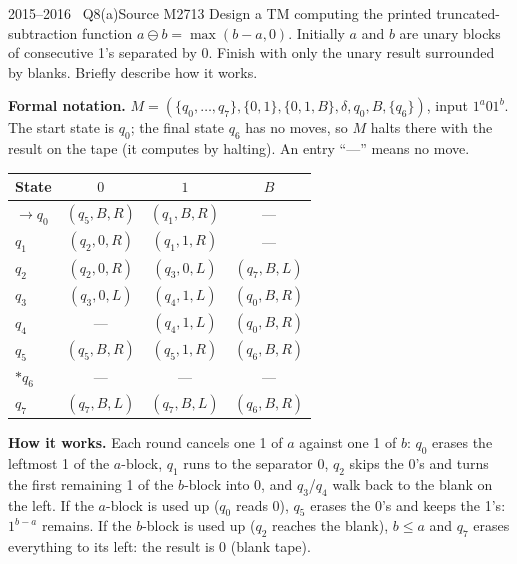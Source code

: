 \documentclass[11pt,a4paper]{article}
\begin{document}
\begin{question}{2015--2016 \textbullet\ Q8(a)}{Source M27}{13}
Design a TM computing the printed truncated-subtraction function $a\ominus b=\max(b-a,0)$. Initially $a$ and $b$ are unary blocks of consecutive 1's separated by 0. Finish with only the unary result surrounded by blanks. Briefly describe how it works.
\end{question}
\begin{solution}
\textbf{Formal notation.} $M=(\{q_0,\dots,q_7\},\{0,1\},\{0,1,B\},\delta,q_0,B,\{q_6\})$, input $1^a01^b$. The start state is $q_0$; the final state $q_6$ has no moves, so $M$ halts there with the result on the tape (it computes by halting). An entry ``---'' means no move.
\begin{center}\small\begin{tabular}{l|ccc}\toprule
State & $0$ & $1$ & $B$\\\midrule
$\to q_0$ & $(q_5,B,R)$ & $(q_1,B,R)$ & ---\\
$q_1$ & $(q_2,0,R)$ & $(q_1,1,R)$ & ---\\
$q_2$ & $(q_2,0,R)$ & $(q_3,0,L)$ & $(q_7,B,L)$\\
$q_3$ & $(q_3,0,L)$ & $(q_4,1,L)$ & $(q_0,B,R)$\\
$q_4$ & --- & $(q_4,1,L)$ & $(q_0,B,R)$\\
$q_5$ & $(q_5,B,R)$ & $(q_5,1,R)$ & $(q_6,B,R)$\\
$*q_6$ & --- & --- & ---\\
$q_7$ & $(q_7,B,L)$ & $(q_7,B,L)$ & $(q_6,B,R)$\\\bottomrule\end{tabular}\end{center}
\textbf{How it works.} Each round cancels one 1 of $a$ against one 1 of $b$: $q_0$ erases the leftmost 1 of the $a$-block, $q_1$ runs to the separator 0, $q_2$ skips the 0's and turns the first remaining 1 of the $b$-block into 0, and $q_3$/$q_4$ walk back to the blank on the left. If the $a$-block is used up ($q_0$ reads 0), $q_5$ erases the 0's and keeps the 1's: $1^{b-a}$ remains. If the $b$-block is used up ($q_2$ reaches the blank), $b\le a$ and $q_7$ erases everything to its left: the result is 0 (blank tape).
\end{solution}
\end{document}

